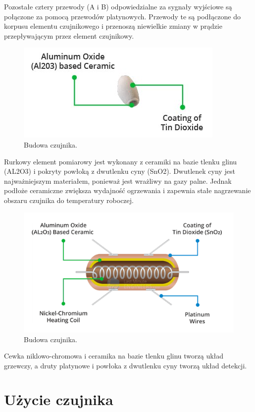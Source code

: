 \documentclass[11pt, a4paper]{article}
\begin{document}
Pozostałe cztery przewody (A i B) odpowiedzialne za sygnały wyjściowe są połączone za pomocą przewodów platynowych. Przewody te są podłączone do korpusu elementu czujnikowego i przenoszą niewielkie zmiany w prądzie przepływającym przez element czujnikowy.
\vspace{2cm}
\begin{figure}[h]
\centering
\includegraphics[width=.5\linewidth]{fig/element/ininfot.png}
\caption{Budowa czujnika.\cite{fot2}}
\label{fig:test}
\end{figure}
\vspace{0.5cm}

Rurkowy element pomiarowy jest wykonany z ceramiki na bazie tlenku glinu (AL2O3) i pokryty powłoką z dwutlenku cyny (SnO2). Dwutlenek cyny jest najważniejszym materiałem, ponieważ jest wrażliwy na gazy palne. Jednak podłoże ceramiczne zwiększa wydajność ogrzewania i zapewnia stałe nagrzewanie obszaru czujnika do temperatury roboczej.
\newpage
\begin{figure}[h!]
    \centering
    \includegraphics[width=0.8\linewidth]{fig/element/structfot.png}
    \caption{Budowa czujnika.\cite{fot2}}
    \label{fig:my_label}
\end{figure}
\vspace{0.5cm}
Cewka niklowo-chromowa i ceramika na bazie tlenku glinu tworzą układ grzewczy, a druty platynowe i powłoka z dwutlenku cyny tworzą układ detekcji.
\section{Użycie czujnika}
\end{document}
